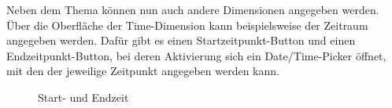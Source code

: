 \newpage
Neben dem Thema können nun auch andere Dimensionen angegeben werden. Über die Oberfläche der Time-Dimension kann beispielsweise der Zeitraum angegeben werden. Dafür gibt es einen Startzeitpunkt-Button und einen Endzeitpunkt-Button, bei deren Aktivierung sich ein Date/Time-Picker öffnet, mit den der jeweilige Zeitpunkt angegeben werden kann.\newline
\hspace*{0cm}
\begin{minipage}{0.47\linewidth}
	\begin{figure}[H]
		\centering
		\caption{Start- und Endzeit}
		\label{fig:time1}
	\end{figure}
\end{minipage}
